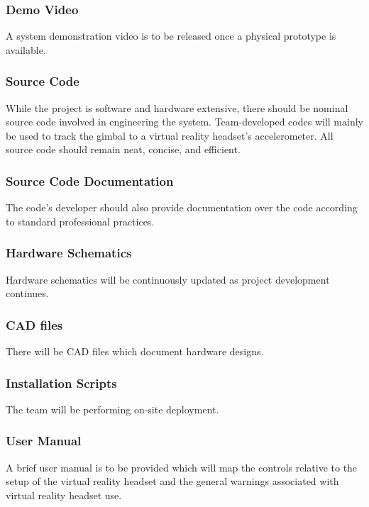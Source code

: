 \subsubsection{Demo Video}
A system demonstration video is to be released once a physical prototype is available.

\subsubsection{Source Code}
While the project is software and hardware extensive, there should be nominal source code involved in engineering the system. Team-developed codes will mainly be used to track the gimbal to a virtual reality headset's accelerometer. All source code should remain neat, concise, and efficient.

\subsubsection{Source Code Documentation}
The code's developer should also provide documentation over the code according to standard professional practices.

\subsubsection{Hardware Schematics}
Hardware schematics will be continuously updated as project development continues.

\subsubsection{CAD files}
There will be CAD files which document hardware designs.

\subsubsection{Installation Scripts}
The team will be performing on-site deployment.

\subsubsection{User Manual}
A brief user manual is to be provided which will map the controls relative to the setup of the virtual reality headset and the general warnings associated with virtual reality headset use.
